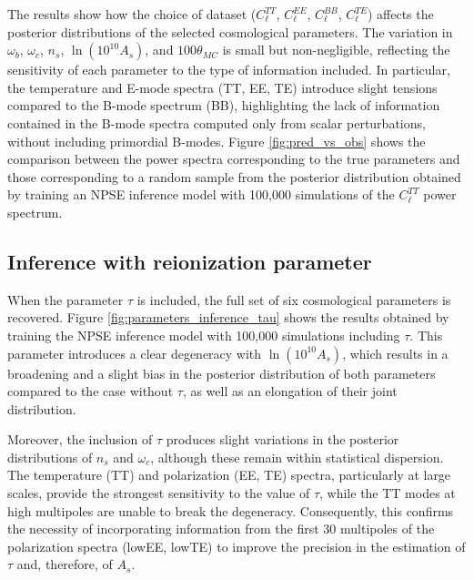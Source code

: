 The results show how the choice of dataset ($C_{\ell}^{TT}$, $C_{\ell}^{EE}$, $C_{\ell}^{BB}$, $C_{\ell}^{TE}$) affects the posterior distributions of the selected cosmological parameters. The variation in $\omega_b$, $\omega_c$, $n_s$, $\ln(10^{10}A_s)$, and $100\theta_{MC}$ is small but non-negligible, reflecting the sensitivity of each parameter to the type of information included. In particular, the temperature and E-mode spectra (TT, EE, TE) introduce slight tensions compared to the B-mode spectrum (BB), highlighting the lack of information contained in the B-mode spectra computed only from scalar perturbations, without including primordial B-modes. Figure \ref{fig:pred_vs_obs} shows the comparison between the power spectra corresponding to the true parameters and those corresponding to a random sample from the posterior distribution obtained by training an NPSE inference model with 100,000 simulations of the $C_{\ell}^{TT}$ power spectrum.  

\subsection{Inference with reionization parameter}
When the parameter $\tau$ is included, the full set of six cosmological parameters is recovered. Figure \ref{fig:parameters_inference_tau} shows the results obtained by training the NPSE inference model with 100,000 simulations including $\tau$. This parameter introduces a clear degeneracy with $\ln(10^{10}A_s)$, which results in a broadening and a slight bias in the posterior distribution of both parameters compared to the case without $\tau$, as well as an elongation of their joint distribution.  

Moreover, the inclusion of $\tau$ produces slight variations in the posterior distributions of $n_s$ and $\omega_c$, although these remain within statistical dispersion. The temperature (TT) and polarization (EE, TE) spectra, particularly at large scales, provide the strongest sensitivity to the value of $\tau$, while the TT modes at high multipoles are unable to break the degeneracy. Consequently, this confirms the necessity of incorporating information from the first 30 multipoles of the polarization spectra (lowEE, lowTE) to improve the precision in the estimation of $\tau$ and, therefore, of $A_s$.

